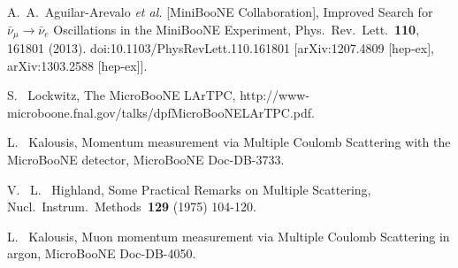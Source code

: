 \begin{thebibliography}{1}
 
  


  
  A.~A.~Aguilar-Arevalo {\it et al.} 
  [MiniBooNE Collaboration],
  Improved Search for $\bar \nu_\mu \rightarrow \bar \nu_e$ Oscillations in the MiniBooNE Experiment,
  Phys.\ Rev.\ Lett.\  {\bf 110}, 161801 (2013).
  doi:10.1103/PhysRevLett.110.161801
  [arXiv:1207.4809 [hep-ex], arXiv:1303.2588 [hep-ex]].
  
  S. ~Lockwitz, 
  The MicroBooNE LArTPC,
  http://www-microboone.fnal.gov/talks/dpfMicroBooNELArTPC.pdf.
  
  L. ~Kalousis, 
  Momentum measurement via Multiple Coulomb
Scattering with the MicroBooNE detector, 
  MicroBooNE Doc-DB-3733.
  
  V. ~L. ~Highland, 
  Some Practical Remarks on Multiple Scattering, 
  Nucl.\ Instrum.\ Methods\ {\bf 129} (1975)
104-120.
  
  L. ~Kalousis, 
  Muon momentum measurement via Multiple Coulomb Scattering in argon,
  MicroBooNE Doc-DB-4050.

\end{thebibliography}